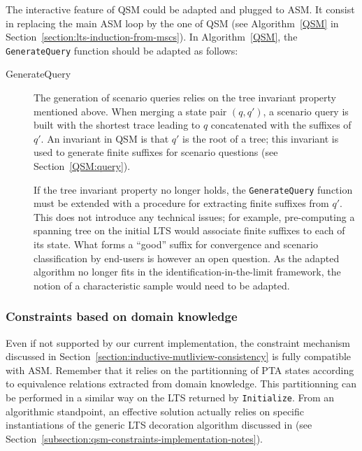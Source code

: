 The interactive feature of QSM could be adapted and plugged to ASM. It consist in replacing the main ASM loop by the one of QSM (see Algorithm~\ref{QSM} in Section~\ref{section:lts-induction-from-mscs}). In Algorithm~\ref{QSM}, the \texttt{GenerateQuery} function should be adapted as follows:
\begin{description}

\item[GenerateQuery] The generation of scenario queries relies on the tree invariant property mentioned above. When merging a state pair $(q,q')$, a scenario query is built with the shortest trace leading to $q$ concatenated with the suffixes of $q'$. An invariant in QSM is that $q'$ is the root of a tree; this invariant is used to generate finite suffixes for scenario questions (see Section~\ref{QSM:query}).

If the tree invariant property no longer holds, the \texttt{GenerateQuery} function must be extended with a procedure for extracting finite suffixes from $q'$. This does not introduce any technical issues; for example, pre-computing a spanning tree on the initial LTS would associate finite suffixes to each of its state. What forms a ``good'' suffix for convergence and scenario classification by end-users is however an open question. As the adapted algorithm no longer fits in the identification-in-the-limit framework, the notion of a characteristic sample would need to be adapted.

\end{description}

\subsubsection*{Constraints based on domain knowledge}

Even if not supported by our current implementation, the constraint mechanism discussed in Section~\ref{section:inductive-mutliview-consistency} is fully compatible with ASM. Remember that it relies on the partitionning of PTA states according to equivalence relations extracted from domain knowledge. This partitionning can be performed in a similar way on the LTS returned by \texttt{Initialize}. From an algorithmic standpoint, an effective solution actually relies on specific instantiations of the generic LTS decoration algorithm discussed in \cite{Damas:2011} (see Section~\ref{subsection:qsm-constraints-implementation-notes}).
